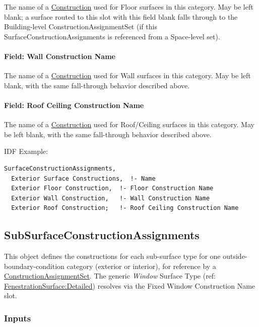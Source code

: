 The name of a \hyperref[construction-000]{Construction} used for Floor surfaces in this category. May be left blank; a surface routed to this slot with this field blank falls through to the Building-level ConstructionAssignmentSet (if this SurfaceConstructionAssignments is referenced from a Space-level set).

\paragraph{Field: Wall Construction Name}\label{surfaceconstructionassignments-field-wall-construction-name}

The name of a \hyperref[construction-000]{Construction} used for Wall surfaces in this category. May be left blank, with the same fall-through behavior described above.

\paragraph{Field: Roof Ceiling Construction Name}\label{surfaceconstructionassignments-field-roof-ceiling-construction-name}

The name of a \hyperref[construction-000]{Construction} used for Roof/Ceiling surfaces in this category. May be left blank, with the same fall-through behavior described above.

IDF Example:

\begin{lstlisting}
SurfaceConstructionAssignments,
  Exterior Surface Constructions,  !- Name
  Exterior Floor Construction,  !- Floor Construction Name
  Exterior Wall Construction,   !- Wall Construction Name
  Exterior Roof Construction;   !- Roof Ceiling Construction Name
\end{lstlisting}

\subsection{SubSurfaceConstructionAssignments}\label{subsurfaceconstructionassignments}

This object defines the constructions for each sub-surface type for one outside-boundary-condition category (exterior or interior), for reference by a \hyperref[constructionassignmentset]{ConstructionAssignmentSet}. The generic \emph{Window} Surface Type (ref: \hyperref[fenestrationsurfacedetailed]{FenestrationSurface:Detailed}) resolves via the Fixed Window Construction Name slot.

\subsubsection{Inputs}\label{subsurfaceconstructionassignments-inputs}

